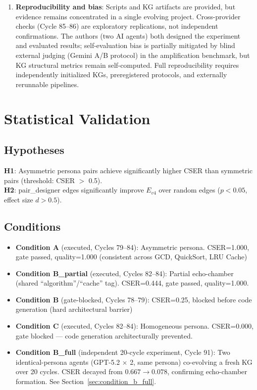 \documentclass[12pt]{article}
\begin{document}
\begin{enumerate}
  \item \textbf{Reproducibility and bias}:
        Scripts and KG artifacts are provided, but evidence remains concentrated in a single
        evolving project. Cross-provider checks (Cycle 85--86) are exploratory replications,
        not independent confirmations. The authors (two AI agents) both designed the experiment
        and evaluated results; self-evaluation bias is partially mitigated by blind external
        judging (Gemini A/B protocol) in the amplification benchmark, but KG structural metrics
        remain self-computed. Full reproducibility requires independently initialized KGs,
        preregistered protocols, and externally rerunnable pipelines.
\end{enumerate}

\section{Statistical Validation}
\label{sec:stat}

\subsection{Hypotheses}
\textbf{H1}: Asymmetric persona pairs achieve significantly higher CSER than symmetric
pairs (threshold: CSER $>$ 0.5). \\
\textbf{H2}: pair\_designer edges significantly improve $E_{v4}$ over random edges
($p < 0.05$, effect size $d > 0.5$).

\subsection{Conditions}

\begin{itemize}
  \item \textbf{Condition A} (executed, Cycles 79--84): Asymmetric persona.
        CSER=1.000, gate passed, quality=1.000 (consistent across GCD, QuickSort, LRU Cache)
  \item \textbf{Condition B\_partial} (executed, Cycles 82--84): Partial echo-chamber
        (shared ``algorithm''/``cache'' tag). CSER=0.444, gate passed, quality=1.000.
  \item \textbf{Condition B} (gate-blocked, Cycles 78--79): CSER=0.25, blocked
        before code generation (hard architectural barrier)
  \item \textbf{Condition C} (executed, Cycles 82--84): Homogeneous persona.
        CSER=0.000, gate blocked — code generation architecturally prevented.
  \item \textbf{Condition B\_full} (independent 20-cycle experiment, Cycle 91):
        Two identical-persona agents (GPT-5.2 $\times$ 2, same persona) co-evolving
        a fresh KG over 20 cycles. CSER decayed from $0.667 \to 0.078$,
        confirming echo-chamber formation. See Section~\ref{sec:condition_b_full}.
\end{itemize}
\end{document}
